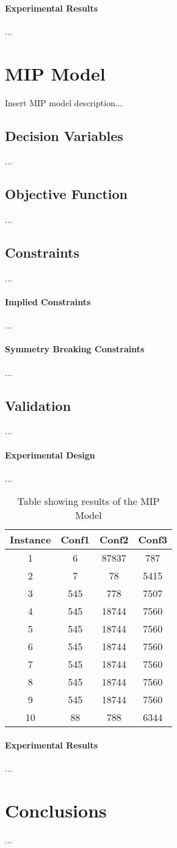 \documentclass{article}
\begin{document}
\paragraph{Experimental Results}
...


\section{MIP Model}
Insert MIP model description...
\subsection{Decision Variables}
...
\subsection{Objective Function}
...
\subsection{Constraints}
...
\paragraph{Implied Constraints}
...
\paragraph{Symmetry Breaking Constraints}
...
\subsection{Validation}
...
\paragraph{Experimental Design}
...
\begin{table}[h!]
\centering
\begin{tabular}{|c | c c c|} 
 \hline
 Instance & Conf1 & Conf2 & Conf3\\ [0.5ex] 
 \hline\hline
 1 & 6 & 87837 & 787 \\ 
 2 & 7 & 78 & 5415 \\
 3 & 545 & 778 & 7507 \\
 4 & 545 & 18744 & 7560 \\
 5 & 545 & 18744 & 7560 \\
 6 & 545 & 18744 & 7560 \\
 7 & 545 & 18744 & 7560 \\
 8 & 545 & 18744 & 7560 \\
 9 & 545 & 18744 & 7560 \\
 10 & 88 & 788 & 6344 \\ [1ex] 
 \hline
\end{tabular}
\caption{Table showing results of the MIP Model}
\label{table:1}
\end{table}
\paragraph{Experimental Results}
...

\section{Conclusions}
...
\end{document}
